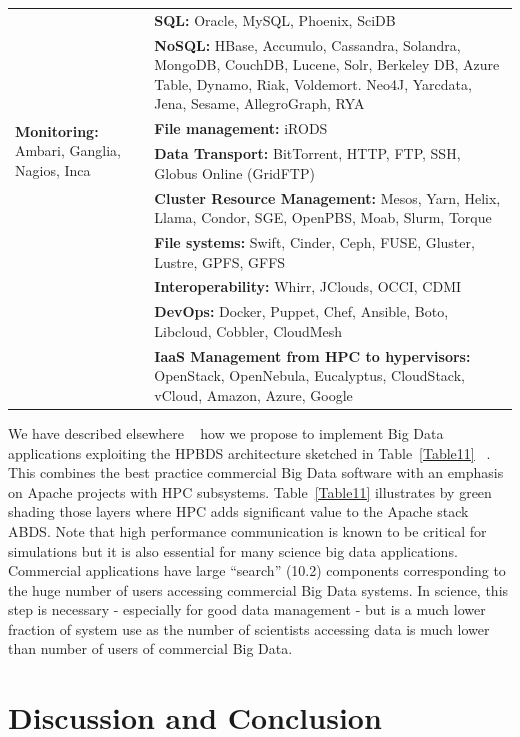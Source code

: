 \documentclass{acm_proc_article-sp}
\begin{document}
\begin{table}[t]
\begin{tabular}{|p{2cm}|p{6cm}|}
&\textbf{SQL:} Oracle, MySQL, Phoenix, SciDB\\ \cline{2-2} 
&\textbf{NoSQL:} HBase, Accumulo, Cassandra, Solandra, MongoDB, CouchDB, Lucene, Solr, Berkeley DB, Azure Table, Dynamo, Riak, Voldemort. Neo4J, Yarcdata, Jena, Sesame, AllegroGraph, RYA\\ \hline
\multirow{2}{2cm}{\textbf{Monitoring:} Ambari, Ganglia, Nagios, Inca}
&\textbf{File management:} iRODS\\ \cline{2-2} 
&\textbf{Data Transport:} BitTorrent, HTTP, FTP, SSH, Globus Online (GridFTP)\\ \cline{2-2} 
&\textbf{Cluster Resource Management:} Mesos, Yarn, Helix, Llama, Condor, SGE, OpenPBS, Moab, Slurm, Torque\\ \cline{2-2} 
&\textbf{File systems:} Swift, Cinder, Ceph, FUSE, Gluster, Lustre, GPFS, GFFS\\ \cline{2-2} 
&\textbf{Interoperability:} Whirr, JClouds, OCCI, CDMI\\ \cline{2-2} 
&\textbf{DevOps:} Docker, Puppet, Chef, Ansible, Boto, Libcloud, Cobbler, CloudMesh\\ \cline{2-2} 
&\textbf{IaaS Management from HPC to hypervisors:} OpenStack, OpenNebula, Eucalyptus, CloudStack, vCloud, Amazon, Azure, Google\\ \hline
\end{tabular}

\end{table}


We have described elsewhere ~\cite{b30,b14,b27} how we propose to implement Big Data applications exploiting the HPBDS architecture sketched in Table~\ref{Table11} ~\cite{b2}. This combines the best practice commercial Big Data software with an emphasis on Apache projects with HPC subsystems. Table~\ref{Table11} illustrates by green shading those layers where HPC adds significant value to the Apache stack ABDS. Note that high performance communication is known to be critical for simulations but it is also essential for many science big data applications. Commercial applications have large ``search'' (10.2) components corresponding to the huge number of users accessing commercial Big Data systems. In science, this step is necessary - especially for good data management - but is a much lower fraction of system use as the number of scientists accessing data is much lower than number of users of commercial Big Data.

\section{Discussion and Conclusion}
\end{document}
